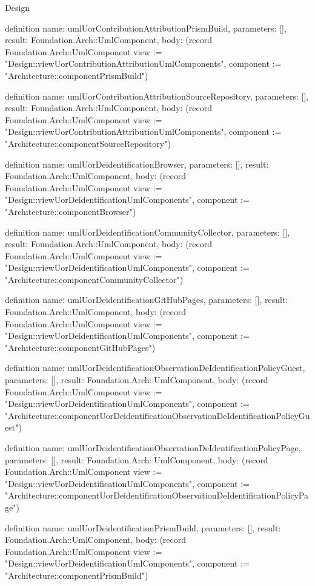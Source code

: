 \begin{lexlean}{Design}
\begin{semanticmodule}
definition{
  name: umlUorContributionAttributionPrismBuild,
  parameters: [],
  result: Foundation.Arch::UmlComponent,
  body: (record Foundation.Arch::UmlComponent {view := "Design::viewUorContributionAttributionUmlComponents", component := "Architecture::componentPrismBuild"})
}

definition{
  name: umlUorContributionAttributionSourceRepository,
  parameters: [],
  result: Foundation.Arch::UmlComponent,
  body: (record Foundation.Arch::UmlComponent {view := "Design::viewUorContributionAttributionUmlComponents", component := "Architecture::componentSourceRepository"})
}

definition{
  name: umlUorDeidentificationBrowser,
  parameters: [],
  result: Foundation.Arch::UmlComponent,
  body: (record Foundation.Arch::UmlComponent {view := "Design::viewUorDeidentificationUmlComponents", component := "Architecture::componentBrowser"})
}

definition{
  name: umlUorDeidentificationCommunityCollector,
  parameters: [],
  result: Foundation.Arch::UmlComponent,
  body: (record Foundation.Arch::UmlComponent {view := "Design::viewUorDeidentificationUmlComponents", component := "Architecture::componentCommunityCollector"})
}

definition{
  name: umlUorDeidentificationGitHubPages,
  parameters: [],
  result: Foundation.Arch::UmlComponent,
  body: (record Foundation.Arch::UmlComponent {view := "Design::viewUorDeidentificationUmlComponents", component := "Architecture::componentGitHubPages"})
}

definition{
  name: umlUorDeidentificationObservationDeIdentificationPolicyGuest,
  parameters: [],
  result: Foundation.Arch::UmlComponent,
  body: (record Foundation.Arch::UmlComponent {view := "Design::viewUorDeidentificationUmlComponents", component := "Architecture::componentUorDeidentificationObservationDeIdentificationPolicyGuest"})
}

definition{
  name: umlUorDeidentificationObservationDeIdentificationPolicyPage,
  parameters: [],
  result: Foundation.Arch::UmlComponent,
  body: (record Foundation.Arch::UmlComponent {view := "Design::viewUorDeidentificationUmlComponents", component := "Architecture::componentUorDeidentificationObservationDeIdentificationPolicyPage"})
}

definition{
  name: umlUorDeidentificationPrismBuild,
  parameters: [],
  result: Foundation.Arch::UmlComponent,
  body: (record Foundation.Arch::UmlComponent {view := "Design::viewUorDeidentificationUmlComponents", component := "Architecture::componentPrismBuild"})
}


\end{semanticmodule}
\end{lexlean}
